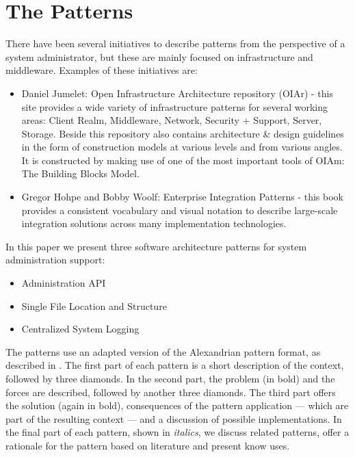 \section{The Patterns}


There have been several initiatives to describe patterns from the perspective of a system administrator, but these are mainly focused on infrastructure and middleware. Examples of these initiatives are: 
\begin{itemize}
	\item Daniel Jumelet: Open Infrastructure Architecture repository (OIAr) \cite{OIAm2014} - this site provides a wide variety of infrastructure patterns for several working areas: Client Realm, Middleware, Network, Security + Support, Server, Storage. Beside this repository also contains architecture \& design guidelines in the form of construction models at various levels and from various angles. It is constructed by making use of one of the most important tools of OIAm: The Building Blocks Model. 
	\item Gregor Hohpe and Bobby Woolf: Enterprise Integration Patterns\cite{Hohpe2003} - this book provides a consistent vocabulary and visual notation to describe large-scale integration solutions across many implementation technologies. 
\end{itemize}

In this paper we present three software architecture patterns for system administration support: 
\begin{itemize} 
	\item {\sc Administration API}
	\item {\sc Single File Location and Structure}
	\item {\sc Centralized System Logging}
\end{itemize}

The patterns use an adapted version of the Alexandrian pattern format, as described in \cite{alexander1977}. The first part of each pattern is a short description of the context, followed by three diamonds. In the second part, the problem (in bold) and the forces are described, followed by another three diamonds. The third part offers the solution (again in bold), consequences of the pattern application --- which are part of the resulting context --- and a discussion of possible implementations. In the final part of each pattern, shown in \textit{italics}, we discuss related patterns, offer a rationale for the pattern based on literature and present know uses.
